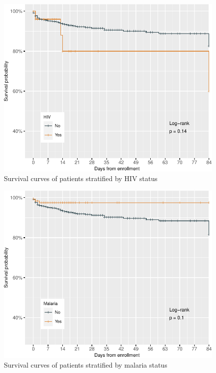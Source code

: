 \documentclass[
  10pt,
]{article}
\begin{document}
\newpage
\begin{figure}[h]

{\centering \includegraphics{results_files/figure-latex/hiv-1} 

}

\caption{Survival curves of patients stratified by HIV status}\label{fig:hiv}
\end{figure}

\newpage
\begin{figure}[h]

{\centering \includegraphics{results_files/figure-latex/malaria-1} 

}

\caption{Survival curves of patients stratified by malaria status}\label{fig:malaria}
\end{figure}
\end{document}
